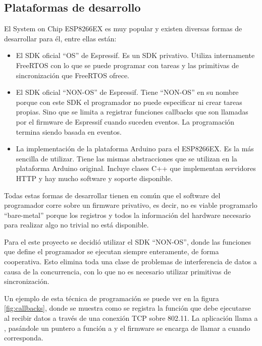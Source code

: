 \subsection{Plataformas de desarrollo}
El System on Chip ESP8266EX es muy popular y existen diversas formas de desarrollar para él, entre ellas están:
\begin{itemize}
	\item El SDK oficial \enquote{OS} de Espressif. Es un SDK privativo. Utiliza internamente FreeRTOS con lo que se puede programar con tareas y las primitivas de sincronización que FreeRTOS ofrece.
	\item El SDK oficial \enquote{NON-OS} de Espressif. Tiene \enquote{NON-OS} en su nombre porque con este SDK el programador no puede especificar ni crear tareas propias. Sino que se limita a registrar funciones callbacks que son llamadas por el firmware de Espressif cuando suceden eventos. La programación termina siendo basada en eventos.
	\item La implementación de la plataforma Arduino para el ESP8266EX. Es la más sencilla de utilizar. Tiene las mismas abstracciones que se utilizan en la plataforma Arduino original. Incluye clases C++ que implementan servidores HTTP y hay mucho software y soporte disponible.
\end{itemize}

Todas estas formas de desarrollar tienen en común que el software del programador corre sobre un firmware privativo, es decir, no es viable programarlo \enquote{bare-metal} porque los registros y todos la información del hardware necesario para realizar algo no trivial no está disponible.

Para el este proyecto se decidió utilizar el SDK \enquote{NON-OS}, donde las funciones que define el programador se ejecutan siempre enteramente, de forma cooperativa. Esto elimina toda una clase de problemas de interferencia de datos a causa de la concurrencia, con lo que no es necesario utilizar primitivas de sincronización.

Un ejemplo de esta técnica de programación se puede ver en la figura \ref{fig:callbacks}, donde se muestra como se registra la función que debe ejecutarse al recibir datos a través de una conexión TCP sobre 802.11. La aplicación llama a , pasándole un puntero a función a  y el firmware se encarga de llamar a  cuando corresponda.

